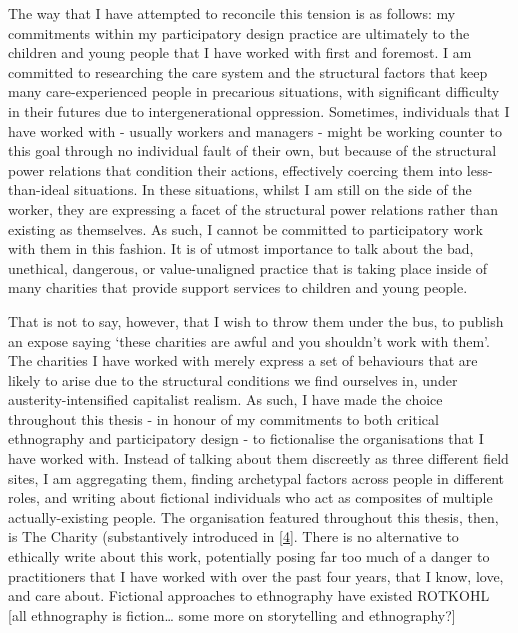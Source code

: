 The way that I have attempted to reconcile this tension is as follows: my commitments within my participatory design practice are ultimately to the children and young people that I have worked with first and foremost. I am committed to researching the care system and the structural factors that keep many care-experienced people in precarious situations, with significant difficulty in their futures due to intergenerational oppression. Sometimes, individuals that I have worked with - usually workers and managers - might be working counter to this goal through no individual fault of their own, but because of the structural power relations that condition their actions, effectively coercing them into less-than-ideal situations. In these situations, whilst I am still on the side of the worker, they are expressing a facet of the structural power relations rather than existing as themselves. As such, I cannot be committed to participatory work with them in this fashion. It is of utmost importance to talk about the bad, unethical, dangerous, or value-unaligned practice that is taking place inside of many charities that provide support services to children and young people.

That is not to say, however, that I wish to throw them under the bus, to publish an expose saying ‘these charities are awful and you shouldn’t work with them’. The charities I have worked with merely express a set of behaviours that are likely to arise due to the structural conditions we find ourselves in, under austerity-intensified capitalist realism. As such, I have made the choice throughout this thesis - in honour of my commitments to both critical ethnography and participatory design - to fictionalise the organisations that I have worked with. Instead of talking about them discreetly as three different field sites, I am aggregating them, finding archetypal factors across people in different roles, and writing about fictional individuals who act as composites of multiple actually-existing people. The organisation featured throughout this thesis, then, is The Charity (substantively introduced in \ref{4}. There is no alternative to ethically write about this work, potentially posing far too much of a danger to practitioners that I have worked with over the past four years, that I know, love, and care about. Fictional approaches to ethnography have existed ROTKOHL [all ethnography is fiction… some more on storytelling and ethnography?]

